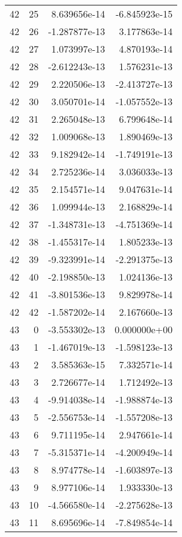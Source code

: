 \begin{tabular}{rrrr}
  42 &   25 &  8.639656e-14 & -6.845923e-15 \\
  42 &   26 & -1.287877e-13 &  3.177863e-14 \\
  42 &   27 &  1.073997e-13 &  4.870193e-14 \\
  42 &   28 & -2.612243e-13 &  1.576231e-13 \\
  42 &   29 &  2.220506e-13 & -2.413727e-13 \\
  42 &   30 &  3.050701e-14 & -1.057552e-13 \\
  42 &   31 &  2.265048e-13 &  6.799648e-14 \\
  42 &   32 &  1.009068e-13 &  1.890469e-13 \\
  42 &   33 &  9.182942e-14 & -1.749191e-13 \\
  42 &   34 &  2.725236e-14 &  3.036033e-13 \\
  42 &   35 &  2.154571e-14 &  9.047631e-14 \\
  42 &   36 &  1.099944e-13 &  2.168829e-14 \\
  42 &   37 & -1.348731e-13 & -4.751369e-14 \\
  42 &   38 & -1.455317e-14 &  1.805233e-13 \\
  42 &   39 & -9.323991e-14 & -2.291375e-13 \\
  42 &   40 & -2.198850e-13 &  1.024136e-13 \\
  42 &   41 & -3.801536e-13 &  9.829978e-14 \\
  42 &   42 & -1.587202e-14 &  2.167660e-13 \\
  43 &    0 & -3.553302e-13 &  0.000000e+00 \\
  43 &    1 & -1.467019e-13 & -1.598123e-13 \\
  43 &    2 &  3.585363e-15 &  7.332571e-14 \\
  43 &    3 &  2.726677e-14 &  1.712492e-13 \\
  43 &    4 & -9.914038e-14 & -1.988874e-13 \\
  43 &    5 & -2.556753e-14 & -1.557208e-13 \\
  43 &    6 &  9.711195e-14 &  2.947661e-14 \\
  43 &    7 & -5.315371e-14 & -4.200949e-14 \\
  43 &    8 &  8.974778e-14 & -1.603897e-13 \\
  43 &    9 &  8.977106e-14 &  1.933330e-13 \\
  43 &   10 & -4.566580e-14 & -2.275628e-13 \\
  43 &   11 &  8.695696e-14 & -7.849854e-14 \\

\end{tabular}
